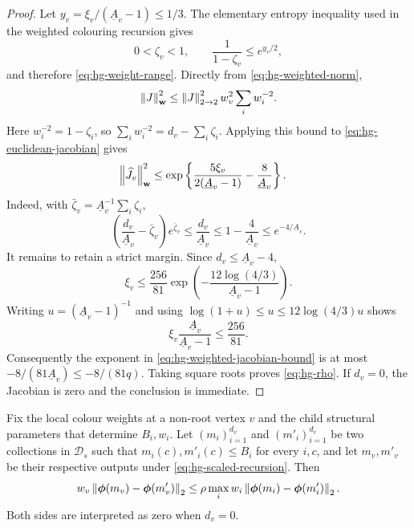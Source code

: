 \begin{proof}
Let \(y_v=\xi_v/(\underline A_v-1)\le1/3\).  The elementary entropy inequality
\cite[Fact~B.5]{CLMM2023} used in the weighted colouring recursion gives
\begin{equation}
 0<\zeta_v<1,\qquad
 \frac1{1-\zeta_v}\le e^{y_v/2},
 \label{eq:hg-entropy-inequality}
\end{equation}
and therefore \eqref{eq:hg-weight-range}.  Directly from
\eqref{eq:hg-weighted-norm},
\[
 \left\|J\right\|_{\mathbf w}^2
 \le \left\|J\right\|_{2\to2}^2 w_v^2\sum_iw_i^{-2}.
\]
Here \(w_i^{-2}=1-\zeta_i\), so
\(\sum_iw_i^{-2}=d_v-\sum_i\zeta_i\).
Applying this bound to \eqref{eq:hg-euclidean-jacobian} gives
\begin{align}
 \left\|\widehat J_v\right\|_{\mathbf w}^2
 &\le
 \exp\left\{
   \frac{5\xi_v}{2(\underline A_v-1)}-\frac8{\underline A_v}
 \right\}.
 \label{eq:hg-weighted-jacobian-bound}
\end{align}
Indeed, with \(\bar\zeta_v=\underline A_v^{-1}\sum_i\zeta_i\),
\[
 \left(\frac{d_v}{\underline A_v}-\bar\zeta_v\right)e^{\bar\zeta_v}
 \le\frac{d_v}{\underline A_v}
 \le1-\frac4{\underline A_v}
 \le e^{-4/\underline A_v}.
\]
It remains to retain a strict margin.  Since
\(d_v\le\underline A_v-4\),
\[
 \xi_v\le\frac{256}{81}
 \exp\left(-\frac{12\log(4/3)}{\underline A_v-1}\right).
\]
Writing \(u=(\underline A_v-1)^{-1}\) and using
$\log(1+u)\le u\le12\log(4/3)u$ shows
\[
 \xi_v\frac{\underline A_v}{\underline A_v-1}\le\frac{256}{81}.
\]
Consequently the exponent in \eqref{eq:hg-weighted-jacobian-bound} is at
most \(-8/(81\underline A_v)\le-8/(81q)\).  Taking square roots proves
\eqref{eq:hg-rho}.  If $d_v=0$, the Jacobian is zero and the conclusion is
immediate.
\end{proof}

\begin{lemma}
\label{lem:hg-finite-difference}
Fix the local colour weights at a non-root vertex \(v\) and the child structural
parameters that determine \(B_i,w_i\).  Let
$(m_i)_{i=1}^{d_v}$ and $(m'_i)_{i=1}^{d_v}$ be two collections in
$\mathcal D_s$ such that
$m_i(c),m'_i(c)\le B_i$ for every $i,c$, and let
\(m_v,m'_v\) be their respective outputs under
\eqref{eq:hg-scaled-recursion}.  Then
\begin{equation}
 w_v\left\|\boldsymbol\phi(m_v)-\boldsymbol\phi(m'_v)\right\|_2
 \le
 \rho\max_i
 w_i\left\|\boldsymbol\phi(m_i)-\boldsymbol\phi(m'_i)\right\|_2 .
 \label{eq:hg-finite-difference}
\end{equation}
Both sides are interpreted as zero when $d_v=0$.
\end{lemma}

